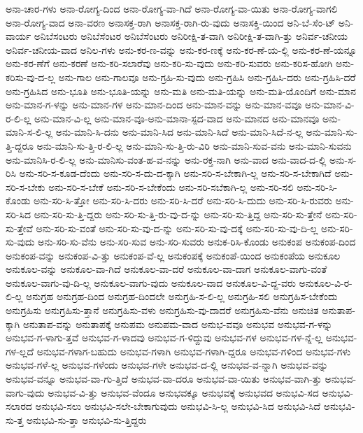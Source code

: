 {ಅನಾ-ಚಾರ-ಗಳು
ಅನಾ-ರೋಗ್ಯ-ದಿಂದ
ಅನಾ-ರೋಗ್ಯ-ವಾ-ಗಿದೆ
ಅನಾ-ರೋಗ್ಯ-ವಾ-ಯಿತು
ಅನಾ-ರೋಗ್ಯ-ವಾಗಲಿ
ಅನಾ-ರೋಗ್ಯ-ವಾದ
ಅನಾ-ವರಣ
ಅನಾಸಕ್ತ-ರಾಗಿ
ಅನಾಸಕ್ತ-ರಾಗಿ-ರು-ವುದು
ಅನಾಸಕ್ತಿ-ಯಿಂದ
ಅನಿ-ಬೆ-ಸೆಂ-ಟ್
ಅನಿ-ವಾರ್ಯ
ಅನಿಬೆಸಂಟರು
ಅನಿಬೆಸೆಂಟರ
ಅನಿಬೆಸೆಂಟರು
ಅನಿರೀಕ್ಷಿ-ತ-ವಾಗಿ
ಅನಿರೀಕ್ಷಿ-ತ-ವಾಗಿ-ತ್ತು
ಅನಿರ್ವ-ಚನೀಯ
ಅನಿರ್ವ-ಚನೀಯ-ವಾದ
ಅನಿಲ-ಗಳು
ಅನು-ಕರ-ಣ-ವನ್ನು
ಅನು-ಕರ-ಣಕ್ಕೆ
ಅನು-ಕರ-ಣೆ-ಯ-ಲ್ಲಿ
ಅನು-ಕರ-ಣೆ-ಯನ್ನೂ
ಅನು-ಕರ-ಣೆಗೆ
ಅನು-ಕರಣೆ
ಅನು-ಕರಿ-ಸಲಾರೆವು
ಅನು-ಕರಿ-ಸು-ವುದು
ಅನು-ಕರಿ-ಸುವರು
ಅನು-ಕರಿಸ-ಹೋಗಿ
ಅನು-ಕರಿಸು-ವು-ದ-ಲ್ಲ
ಅನು-ಗಾಲ
ಅನು-ಗಾಲವೂ
ಅನು-ಗ್ರಹಿ-ಸು-ವುದು
ಅನು-ಗ್ರಹಿಸಿ
ಅನು-ಗ್ರಹಿಸಿ-ದರು
ಅನು-ಗ್ರಹಿಸಿ-ದರೆ
ಅನು-ಗ್ರಹಿಸಿದ
ಅನು-ಭೂತಿ
ಅನು-ಭೂತಿ-ಯನ್ನು
ಅನು-ಮತಿ
ಅನು-ಮತಿ-ಯನ್ನು
ಅನು-ಮತಿ-ಯೊಂದಿಗೆ
ಅನು-ಮಾನ
ಅನು-ಮಾನ-ಗ-ಳನ್ನು
ಅನು-ಮಾನ-ಗಳ
ಅನು-ಮಾನ-ದಿಂದ
ಅನು-ಮಾನ-ವನ್ನು
ಅನು-ಮಾನ-ವವೂ
ಅನು-ಮಾನ-ವಿ-ರ-ಲಿ-ಲ್ಲ
ಅನು-ಮಾನ-ವಿ-ಲ್ಲ
ಅನು-ಮಾನ-ವೂ-ಅನು-ಮಾನಾ-ಸ್ಪದ-ವಾದ
ಅನು-ಮಾನದ
ಅನು-ಮಾನವೂ
ಅನು-ಮಾನಿ-ಸ-ಲಿ-ಲ್ಲ
ಅನು-ಮಾನಿ-ಸಿ-ದನು
ಅನು-ಮಾನಿ-ಸಿದ
ಅನು-ಮಾನಿ-ಸಿದೆ
ಅನು-ಮಾನಿ-ಸಿದೆ-ನ-ಲ್ಲ
ಅನು-ಮಾನಿ-ಸು-ತ್ತಿ-ದ್ದರೂ
ಅನು-ಮಾನಿ-ಸು-ತ್ತಿ-ರ-ಲಿ-ಲ್ಲ
ಅನು-ಮಾನಿ-ಸು-ತ್ತಿ-ರು-ವಿರಿ
ಅನು-ಮಾನಿ-ಸುವ-ವನು
ಅನು-ಮಾನಿ-ಸುವನು
ಅನು-ಮಾನಿಸಿ-ರ-ಲಿ-ಲ್ಲ
ಅನು-ಮಾನಿಸು-ವಂತ-ಹ-ವ-ನನ್ನು
ಅನು-ರಕ್ತ-ನಾಗಿ
ಅನು-ವಾದ
ಅನು-ವಾದ-ದ-ಲ್ಲಿ
ಅನು-ಸ-ರಿಸಿ
ಅನು-ಸರಿ-ಸ-ಕೂಡ-ದೆಂದು
ಅನು-ಸರಿ-ಸ-ದು-ದ-ಕ್ಕಾಗಿ
ಅನು-ಸರಿ-ಸ-ಬೇಕಾಗಿ-ಲ್ಲ
ಅನು-ಸರಿ-ಸ-ಬೇಕಾಗಿದೆ
ಅನು-ಸರಿ-ಸ-ಬೇಕು
ಅನು-ಸರಿ-ಸ-ಬೇಕೆ
ಅನು-ಸರಿ-ಸ-ಬೇಕೆಂದು
ಅನು-ಸರಿ-ಸಬೆಕಾಗಿ-ಲ್ಲ
ಅನು-ಸರಿ-ಸಲಿ
ಅನು-ಸರಿ-ಸಿ-ಕೊಂಡು
ಅನು-ಸರಿ-ಸಿ-ತ್ತೋ
ಅನು-ಸರಿ-ಸಿ-ದರು
ಅನು-ಸರಿ-ಸಿ-ದರೆ
ಅನು-ಸರಿ-ಸಿ-ದುದು
ಅನು-ಸರಿ-ಸಿ-ರುವರು
ಅನು-ಸರಿ-ಸಿದ
ಅನು-ಸರಿ-ಸು-ತ್ತಿ-ದ್ದರು
ಅನು-ಸರಿ-ಸು-ತ್ತಿ-ರು-ವು-ದ-ನ್ನು
ಅನು-ಸರಿ-ಸು-ತ್ತಿದ್ದ
ಅನು-ಸರಿ-ಸು-ತ್ತೇನೆ
ಅನು-ಸರಿ-ಸು-ತ್ತೇವೆ
ಅನು-ಸರಿ-ಸು-ವಂತೆ
ಅನು-ಸರಿ-ಸು-ವು-ದ-ನ್ನು
ಅನು-ಸರಿ-ಸು-ವು-ದಕ್ಕೆ
ಅನು-ಸರಿ-ಸು-ವು-ದಿ-ಲ್ಲ
ಅನು-ಸರಿ-ಸು-ವುದು
ಅನು-ಸರಿ-ಸು-ವೆನು
ಅನು-ಸರಿ-ಸುವ
ಅನು-ಸರಿ-ಸುವರು
ಅನುಕ-ರಿಸಿ-ಕೊಂಡು
ಅನುಕಂಪ
ಅನುಕಂಪ-ದಿಂದ
ಅನುಕಂಪ-ವನ್ನು
ಅನುಕಂಪ-ವಿ-ತ್ತು
ಅನುಕಂಪ-ವೆ-ಲ್ಲ
ಅನುಕಂಪಕ್ಕೆ
ಅನುಕಂಪೆ-ಯಿಂದ
ಅನುಕಂಪೆಯ
ಅನುಕೂಲ
ಅನುಕೂಲ-ವನ್ನು
ಅನುಕೂಲ-ವಾ-ಗಿದೆ
ಅನುಕೂಲ-ವಾ-ದರೆ
ಅನುಕೂಲ-ವಾ-ದಾಗ
ಅನುಕೂಲ-ವಾಗು-ವಂತೆ
ಅನುಕೂಲ-ವಾಗು-ವು-ದಿ-ಲ್ಲ
ಅನುಕೂಲ-ವಾಗು-ವುದು
ಅನುಕೂಲ-ವಾದ
ಅನುಕೂಲ-ವಿ-ದ್ದ-ವರು
ಅನುಕೂಲ-ವಿ-ರ-ಲಿ-ಲ್ಲ
ಅನುಗ್ರಹ
ಅನುಗ್ರಹ-ದಿಂದ
ಅನುಗ್ರಹ-ದಿಂದಲೇ
ಅನುಗ್ರಹಿ-ಸ-ಲಿ-ಲ್ಲ
ಅನುಗ್ರಹಿ-ಸಲಿ
ಅನುಗ್ರಹಿಸ-ಬೇಕೆಂದು
ಅನುಗ್ರಹಿಸು
ಅನುಗ್ರಹಿಸು-ತ್ತಾನೆ
ಅನುಗ್ರಹಿಸು-ವಳು
ಅನುಗ್ರಹಿಸು-ವು-ದಾದರೆ
ಅನುಗ್ರಹಿಸು-ವೆನು
ಅನುಚಿತ
ಅನುತಾಪ-ಕ್ಕಾಗಿ
ಅನುತಾಪ-ವನ್ನು
ಅನುತಾಪಕ್ಕೆ
ಅನುಪಮ
ಅನುಪಮ-ವಾದ
ಅನುಭ-ವವೂ
ಅನುಭವ
ಅನುಭವ-ಗ-ಳನ್ನು
ಅನುಭವ-ಗ-ಳಾಗು-ತ್ತವೆ
ಅನುಭವ-ಗ-ಳಾದವು
ಅನುಭವ-ಗ-ಳಿದ್ದುವು
ಅನುಭವ-ಗಳ
ಅನುಭವ-ಗಳ-ನ್ನೆ-ಲ್ಲ
ಅನುಭವ-ಗಳ-ಲ್ಲದೆ
ಅನುಭವ-ಗಳಾಗ-ಬಹುದು
ಅನುಭವ-ಗಳಾಗಿ
ಅನುಭವ-ಗಳಾಗಿ-ದ್ದರೂ
ಅನುಭವ-ಗಳಿಂದ
ಅನುಭವ-ಗಳು
ಅನುಭವ-ಗಳೆ-ಲ್ಲ
ಅನುಭವ-ಗಳೆಂದು
ಅನುಭವ-ಗಳೇ
ಅನುಭವ-ದ-ಲ್ಲಿ
ಅನುಭವ-ವ-ನ್ನಾಗಿ
ಅನುಭವ-ವನ್ನು
ಅನುಭವ-ವನ್ನೂ
ಅನುಭವ-ವಾ-ಗು-ತ್ತಿದೆ
ಅನುಭವ-ವಾ-ದರೂ
ಅನುಭವ-ವಾ-ಯಿತು
ಅನುಭವ-ವಾಗಿ-ತ್ತು
ಅನುಭವ-ವಾಗು-ವುದು
ಅನುಭವ-ವಿ-ತ್ತು
ಅನುಭವ-ವೆಂದೂ
ಅನುಭವಕ್ಕೂ
ಅನುಭವಕ್ಕೆ
ಅನುಭವದ
ಅನುಭವಿ-ಸದ
ಅನುಭವಿ-ಸಲಾರದ
ಅನುಭವಿ-ಸಲು
ಅನುಭವಿ-ಸಲೇ-ಬೇಕಾಗುವುದು
ಅನುಭವಿ-ಸಿ-ಲ್ಲ
ಅನುಭವಿ-ಸಿದ
ಅನುಭವಿ-ಸಿದೆ
ಅನುಭವಿ-ಸು-ತ್ತ
ಅನುಭವಿ-ಸು-ತ್ತಾ
ಅನುಭವಿ-ಸು-ತ್ತಿದ್ದರು
}

